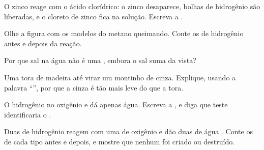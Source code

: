 \begin{exercise}[$\star\star$]\label{exo:g7:chemical-reactions:6}
O zinco reage com o ácido clorídrico: o zinco desaparece, bolhas de
hidrogênio são liberadas, e o cloreto de zinco fica na solução. Escreva
a .
\end{exercise}

\begin{exercise}[$\star\star$]\label{exo:g7:chemical-reactions:7}
Olhe a figura com os modelos do metano queimando. Conte os  de
hidrogênio antes e depois da reação.
\end{exercise}

\begin{exercise}[$\star\star$]\label{exo:g7:chemical-reactions:8}
Por que  sal na água não é uma , embora o sal
suma da vista?
\end{exercise}

\begin{exercise}[$\star\star$]\label{exo:g7:chemical-reactions:9}
Uma tora de madeira  até virar um montinho de cinza. Explique,
usando a palavra ``'', por que a cinza é tão mais leve do que a
tora.
\end{exercise}

\begin{exercise}[$\star\star$]\label{exo:g7:chemical-reactions:10}
O hidrogênio  no oxigênio e dá apenas água. Escreva a , e diga que teste identificaria o .
\end{exercise}

\begin{exercise}[$\star\star\star$]\label{exo:g7:chemical-reactions:11}
Duas  de hidrogênio  reagem com uma  de oxigênio
 e dão duas  de água . Conte os  de cada
tipo antes e depois, e mostre que nenhum foi criado ou destruído.
\end{exercise}

